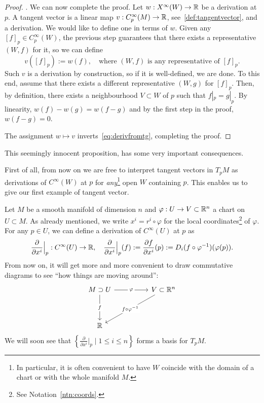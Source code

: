\begin{proof}
  . We can now complete the proof.
  Let $w:X^\infty(W) \to\mathbb{R}$ be a derivation at $p$.
  A tangent vector is a linear map $v:C_p^\infty(M)\to\mathbb{R}$, see~\eqref{def:tangentvector}, and a derivation.
  We would like to define one in terms of $w$.
  Given any $[f]_p\in C_p^\infty(W)$, the previous step guarantees that there exists a representative $(W,f)$ for it, so we can define
  \begin{equation}
    v([f]_p) := w(f), \quad\mbox{where $(W,f)$ is any representative of $[f]_p$}.
  \end{equation}
  Such $v$ is a derivation by construction, so if it is well-defined, we are done.
  To this end, assume that there exists a different representative $(W, g)$ for $[f]_p$.
  Then, by definition, there exists a neighbourhood $V\subset W$ of $p$ such that $f|_p = g|_p$.
  By linearity, $w(f) - w(g) = w(f-g)$ and by the first step in the proof, $w(f-g) = 0$.
  
  The assignment $w\mapsto v$ inverts~\eqref{eq:derivfromtg}, completing the proof.
\end{proof}

This seemingly innocent proposition, has some very important consequences.

First of all, from now on we are free to interpret tangent vectors in $T_p M$ as derivations of $C^\infty(W)$ at $p$ for \emph{any}\footnote{In particular, it is often convenient to have $W$ coincide with the domain of a chart or with the whole manifold $M$.} open $W$ containing $p$.
This enables us to give our first example of tangent vector.

\begin{example}\label{ex:partialderivative}
  Let $M$ be a smooth manifold of dimension $n$ and $\varphi: U \to V\subset\mathbb{R}^n$ a chart on $U\subset M$.
  As already mentioned, we write $x^i = r^i \circ \varphi$ for the local coordinates\footnote{See Notation~\ref{ntn:coords}.} of $\varphi$.
  For any $p\in U$, we can define a derivation of $C^\infty(U)$ at $p$ as
  \begin{equation}
    \frac{\partial}{\partial x^i}\Big|_p : C^\infty(U) \to \mathbb{R}, \quad
    \frac{\partial}{\partial x^i}\Big|_p (f) := \frac{\partial f}{\partial x^i}(p) := D_i(f\circ\varphi^{-1})(\varphi(p)).
  \end{equation}
  From now on, it will get more and more convenient to draw commutative diagrams to see ``how things are moving around'':
  \begin{equation}
    \begin{tikzcd}[column sep = huge, row sep = huge]
      M\supset U \arrow[r, "\varphi" description] \arrow[d, "f" description] & V \subset\R^n \arrow [dl, "f\circ\varphi^{-1}" description]\\
      \R &
    \end{tikzcd}
  \end{equation}
  We will soon see that $\left\{\frac{\partial}{\partial x^i}\Big|_p \mid 1\leq i\leq n\right\}$ forms a basis for $T_p M$.
\end{example}

